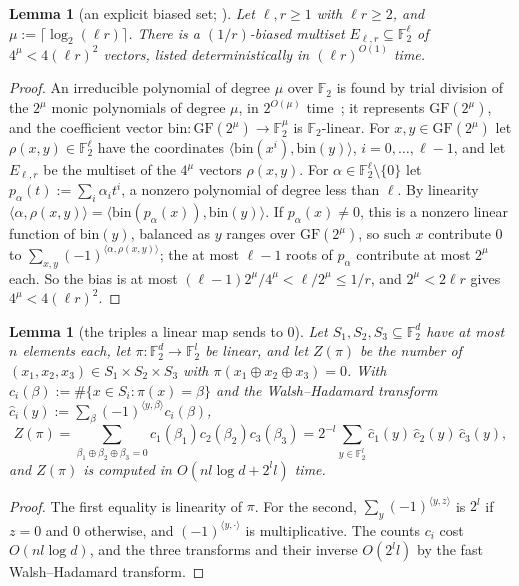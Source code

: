 \documentclass[11pt]{article}
\newtheorem{lemma}[theorem]{Lemma}
\theoremstyle{definition}
\theoremstyle{remark}
\newcommand{\F}{\mathbb{F}_2}
\begin{document}
\begin{lemma}[an explicit biased set; {\cite[Proposition~3]{AGHP92}}]\label{x:lem:aghp}
Let $\ell,r\ge1$ with $\ell r\ge2$, and $\mu:=\lceil\log_2(\ell r)\rceil$. There is a $(1/r)$-biased multiset $E_{\ell,r}\subseteq\F^\ell$ of $4^\mu<4(\ell r)^2$ vectors, listed deterministically in $(\ell r)^{O(1)}$ time.
\end{lemma}
\begin{proof}
An irreducible polynomial of degree $\mu$ over $\F$ is found by trial division of the $2^\mu$ monic polynomials of degree $\mu$, in $2^{O(\mu)}$ time~\cite[p.~14]{AGHP92}; it represents $\mathrm{GF}(2^\mu)$, and the coefficient vector $\mathrm{bin}\colon\mathrm{GF}(2^\mu)\to\F^\mu$ is $\F$-linear. For $x,y\in\mathrm{GF}(2^\mu)$ let $\rho(x,y)\in\F^\ell$ have the coordinates $\langle\mathrm{bin}(x^i),\mathrm{bin}(y)\rangle$, $i=0,\dots,\ell-1$, and let $E_{\ell,r}$ be the multiset of the $4^\mu$ vectors $\rho(x,y)$. For $\alpha\in\F^\ell\setminus\{0\}$ let $p_\alpha(t):=\sum_i\alpha_it^i$, a nonzero polynomial of degree less than $\ell$. By linearity $\langle\alpha,\rho(x,y)\rangle=\langle\mathrm{bin}(p_\alpha(x)),\mathrm{bin}(y)\rangle$. If $p_\alpha(x)\ne0$, this is a nonzero linear function of $\mathrm{bin}(y)$, balanced as $y$ ranges over $\mathrm{GF}(2^\mu)$, so such $x$ contribute $0$ to $\sum_{x,y}(-1)^{\langle\alpha,\rho(x,y)\rangle}$; the at most $\ell-1$ roots of $p_\alpha$ contribute at most $2^\mu$ each. So the bias is at most $(\ell-1)2^\mu/4^\mu<\ell/2^\mu\le1/r$, and $2^\mu<2\ell r$ gives $4^\mu<4(\ell r)^2$.
\end{proof}

\begin{lemma}[the triples a linear map sends to $0$]\label{x:lem:wh}
Let $S_1,S_2,S_3\subseteq\F^d$ have at most $n$ elements each, let $\pi\colon\F^d\to\F^l$ be linear, and let $Z(\pi)$ be the number of $(x_1,x_2,x_3)\in S_1\times S_2\times S_3$ with $\pi(x_1\oplus x_2\oplus x_3)=0$. With $c_i(\beta):=\#\{x\in S_i:\pi(x)=\beta\}$ and the Walsh--Hadamard transform $\hat c_i(y):=\sum_\beta(-1)^{\langle y,\beta\rangle}c_i(\beta)$,
\[
Z(\pi)=\sum_{\beta_1\oplus\beta_2\oplus\beta_3=0}c_1(\beta_1)c_2(\beta_2)c_3(\beta_3)=2^{-l}\sum_{y\in\F^l}\hat c_1(y)\,\hat c_2(y)\,\hat c_3(y),
\]
and $Z(\pi)$ is computed in $O(nl\log d+2^ll)$ time.
\end{lemma}
\begin{proof}
The first equality is linearity of $\pi$. For the second, $\sum_y(-1)^{\langle y,z\rangle}$ is $2^l$ if $z=0$ and $0$ otherwise, and $(-1)^{\langle y,\cdot\rangle}$ is multiplicative. The counts $c_i$ cost $O(nl\log d)$, and the three transforms and their inverse $O(2^ll)$ by the fast Walsh--Hadamard transform.
\end{proof}
\end{document}

